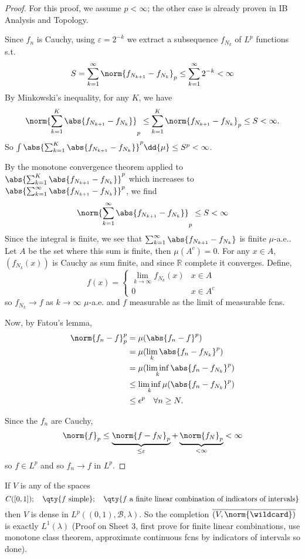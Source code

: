 \begin{proof}
	For this proof, we assume $p < \infty$; the other case is already proven in IB Analysis and Topology.

	Since $f_n$ is Cauchy, using $\varepsilon = 2^{-k}$ we extract a subsequence $f_{N_k}$ of $L^p$ functions s.t.
	\[ S = \sum_{k=1}^\infty \norm{f_{N_{k+1}} - f_{N_k}}_p \leq \sum_{k=1}^\infty 2^{-k} < \infty \]
	By Minkowski's inequality, for any $K$, we have
	\[ \norm{\sum_{k=1}^K \abs{f_{N_{k+1}} - f_{N_k}}}_p \leq \sum_{k=1}^K \norm{f_{N_{k+1}} - f_{N_k}}_p \leq S < \infty. \]
	So $\int \abs{\sum_{k=1}^K \abs{f_{N_{k+1}} - f_{N_k}}}^p \dd{\mu} \leq S^p < \infty$.

	By the monotone convergence theorem applied to $\abs{\sum_{k=1}^K \abs{f_{N_{k+1}} - f_{N_k}}}^p$ which increases to $\abs{\sum_{k=1}^\infty \abs{f_{N_{k+1}} - f_{N_k}}}^p$, we find
	\[ \norm{\sum_{k=1}^\infty \abs{f_{N_{k+1}} - f_{N_k}}}_p \leq S < \infty \]
	Since the integral is finite, we see that $\sum_{k=1}^\infty \abs{f_{N_{k+1}} - f_{N_k}}$ is finite $\mu$-a.e..
	Let $A$ be the set where this sum is finite, then $\mu(A^c) = 0$.
	For any $x \in A$, $(f_{N_k}(x))$ is Cauchy as sum finite, and since $\mathbb{R}$ complete it converges.
	Define,
	\[ f(x) = \begin{cases}
		\lim_{k \to \infty} f_{N_k}(x) & x \in A \\
		0 & x \in A^c
	\end{cases} \]
	so $f_{N_k} \to f$ as $k \to \infty$ $\mu$-a.e. and $f$ measurable as the limit of measurable fcns.

	Now, by Fatou's lemma,
	\begin{align*}
		\norm{f_n - f}_p^p &= \mu(\abs{f_n - f}^p) \\
		&= \mu(\lim_k \abs{f_n - f_{N_k}}^p) \\
		&= \mu(\liminf_k \abs{f_n - f_{N_k}}^p) \\
		&\leq \liminf_k \mu(\abs{f_n - f_{N_k}}^p) \\
		&\leq \epsilon^p \quad \forall n \geq N.
	\end{align*}

	Since the $f_n$ are Cauchy,
	\[ \norm{f}_p \leq \underbrace{\norm{f - f_N}_p}_{\leq \varepsilon} + \underbrace{\norm{f_N}_p}_{< \infty} < \infty \]
	so $f \in L^p$ and so $f_n \to f$ in $L^p$.
\end{proof}

\begin{remark}
	If $V$ is any of the spaces
	\[ C([0, 1]);\quad\qty{f \text{ simple}};\quad\qty{f \text{ a finite linear combination of indicators of intervals}} \]
	then $V$ is dense in $L^p((0, 1), \mathcal{B}, \lambda)$.
	So the completion $\overline{(V,\norm{\wildcard})}$ is exactly $L^1(\lambda)$ (Proof on Sheet 3, first prove for finite linear combinations, use monotone class theorem, approximate continuous fcns by indicators of intervals so done).
\end{remark}

